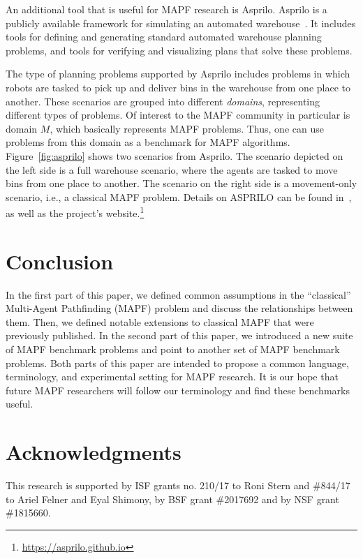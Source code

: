 \documentclass[letterpaper]{article} %
\newcommand{\mapf}{\ac{MAPF}\xspace}
\newcommand{\comment}[1]{{\nb{\textbf{Comment:}}{orange}{#1}}}
\begin{document}
An additional tool that is useful for \mapf research is Asprilo.
Asprilo is a publicly available framework for simulating an automated warehouse~\cite{martin2018experimenting}. It includes tools for defining and generating standard automated warehouse planning problems, and tools for verifying and visualizing plans that solve these problems. 

The type of planning problems supported by Asprilo includes problems in which robots are tasked to pick up and deliver bins in the warehouse from one place to another. These scenarios are grouped into different \emph{domains}, representing different types of problems. Of interest to the \mapf community in particular is domain $M$, which basically represents \mapf problems. Thus, one can use problems from this domain as a benchmark for \mapf algorithms. 
Figure~\ref{fig:asprilo} shows two scenarios from Asprilo. The scenario depicted on the left side is a full warehouse scenario, where the agents are tasked to move bins from one place to another. The scenario on the right side is a movement-only scenario, i.e., a classical \mapf problem. 
Details on ASPRILO can be found in~\cite{martin2018experimenting}, as well as the project's website.\footnote{\url{https://asprilo.github.io}} 

\section{Conclusion}
In the first part of this paper, we defined common assumptions in the ``classical'' Multi-Agent Pathfinding (\mapf) problem and discuss the relationships between them. Then, we defined notable extensions to classical \mapf that were previously published. 
In the second part of this paper, we introduced a new suite of \mapf benchmark problems and point to another set of \mapf benchmark problems. 
Both parts of this paper are intended to propose a common language, terminology, and experimental setting for \mapf research. It is our hope that future \mapf researchers will follow our terminology and find these benchmarks useful. 

\section{Acknowledgments}
This research is supported by ISF grants no. 210/17 to Roni Stern and \#844/17 to Ariel Felner and Eyal Shimony, by BSF grant \#2017692 and by NSF grant \#1815660. %


\vskip 0.2in


\end{document}
